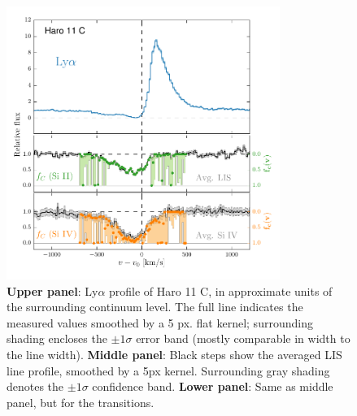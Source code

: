 \documentclass[twocolumn,]{aastex61}
\begin{document}
\begin{figure}
\centering
\includegraphics[width=3.500in]{../Figs/LyACoverfracs.pdf}
\caption{\textbf{Upper panel}: Ly$\alpha$ profile of Haro 11 C, in
approximate units of the surrounding continuum level. The full line
indicates the measured values smoothed by a 5 px. flat kernel; surrounding shading
encloses the $\pm 1 \sigma$ error band (mostly comparable in width to
the line width). \textbf{Middle panel}: Black steps show the averaged
LIS line profile, smoothed by a 5px kernel. Surrounding gray shading
denotes the $\pm 1 \sigma$ confidence band. \textbf{Lower panel}: Same
as middle panel, but for the  transitions.
}\label{fig:HisLisLya}
\end{figure}
\end{document}
